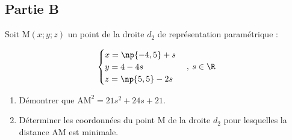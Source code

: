 \subsection*{Partie B}


Soit M$(x ; y ; z)$ un point de la droite $d_2$ de représentation paramétrique :

$$\begin{cases}x=\np{-4,5} +s \\
	y=4-4s \\
	z=\np{5,5}-2s \end{cases},\: s \in \R$$

\begin{enumerate}
	\item Démontrer que $\mathrm{AM}^2 = 21s^2 + 24s + 21$.

	\item Déterminer les coordonnées du point M de la droite $d_2$ pour lesquelles la distance AM est minimale.
\end{enumerate}
